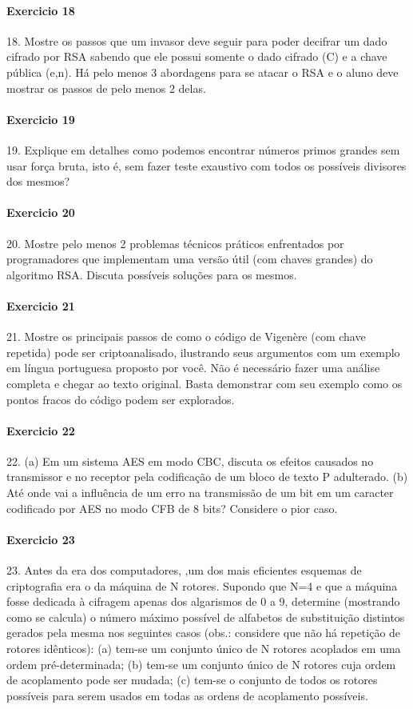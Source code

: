 \documentclass[10pt,a4paper]{report}
\begin{document}
\paragraph{Exercicio 18}
18. Mostre os passos que um invasor deve seguir para poder decifrar um dado cifrado por RSA sabendo que ele possui somente o dado cifrado (C) e a chave pública (e,n). Há pelo menos 3 abordagens para se atacar o RSA e o aluno deve mostrar os passos de pelo menos 2 delas.
\paragraph{Exercicio 19}
19. Explique em detalhes como podemos encontrar números primos grandes sem usar força bruta, isto é, sem fazer teste exaustivo com todos os possíveis divisores dos mesmos?
\paragraph{Exercicio 20}
20. Mostre pelo menos 2 problemas técnicos práticos enfrentados por programadores que implementam uma versão útil (com chaves grandes) do algoritmo RSA. Discuta possíveis soluções para os mesmos.
\paragraph{Exercicio 21}
21. Mostre os principais passos de como o código de Vigenère (com chave repetida) pode ser criptoanalisado, ilustrando seus argumentos com um exemplo em língua portuguesa proposto por você. Não é necessário fazer uma análise completa e chegar ao texto original. Basta demonstrar com seu exemplo como os pontos fracos do código podem ser explorados.
\paragraph{Exercicio 22}
22. (a) Em um sistema AES em modo CBC, discuta os efeitos causados no transmissor e no receptor pela codificação de um bloco de texto P adulterado.
(b) Até onde vai a influência de um erro na transmissão de um bit em um caracter codificado por AES no modo CFB de 8 bits? Considere o pior caso.
\paragraph{Exercicio 23}
23. Antes da era dos computadores, ,um dos mais eficientes esquemas de criptografia era o da máquina de N rotores. Supondo que N=4 e que a máquina fosse dedicada à cifragem apenas dos algarismos de 0 a 9, determine (mostrando como se calcula) o número máximo possível de alfabetos de substituição distintos gerados pela mesma nos seguintes casos (obs.: considere que não há repetição de rotores idênticos):
(a) tem-se um conjunto único de N rotores acoplados em uma ordem pré-determinada;
(b) tem-se um conjunto único de N rotores cuja ordem de acoplamento pode ser mudada;
(c) tem-se o conjunto de todos os rotores possíveis para serem usados em todas as ordens de acoplamento possíveis.
\end{document}
